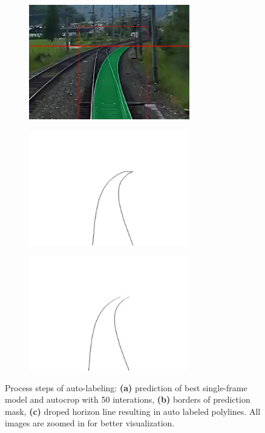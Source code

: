 \begin{figure}[H]
    \centering
    \begin{subfigure}{0.3\textwidth}
        \centering
        \includegraphics[width=\linewidth,height=5cm,keepaspectratio]{PICs/usedDatasets/predictedImage.jpg}
        \caption{}
        \label{fig:autolabler_a}
    \end{subfigure}
    \hspace*{0.02\textwidth} %
    \begin{subfigure}{0.3\textwidth}
        \centering
        \includegraphics[width=\linewidth,height=5cm,keepaspectratio]{PICs/usedDatasets/maskBorders.jpg}
        \caption{}
        \label{fig:autolabler_b}
    \end{subfigure}
    \hspace*{0.02\textwidth} %
    \begin{subfigure}{0.3\textwidth}
        \centering
        \includegraphics[width=\linewidth,height=5cm,keepaspectratio]{PICs/usedDatasets/justLines.jpg}
        \caption{}
        \label{fig:autolabler_c}
    \end{subfigure}
    \caption{Process steps of auto-labeling: \textbf{(a)} prediction of best single-frame model and autocrop with 50 interations, \textbf{(b)} borders of prediction mask, \textbf{(c)} droped horizon line resulting in auto labeled polylines. All images are zoomed in for better visualization.}
    \label{fig:autolabler}
\end{figure}